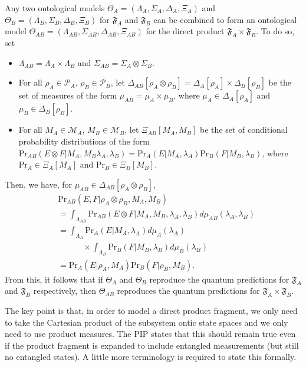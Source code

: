\documentclass[DIV=calc,paper=a4,fontsize=11pt,twocolumn]{scrartcl} %
\theoremstyle{definition}
\theoremstyle{plain}
\begin{document}
Any two ontological models $\Theta_A = (\Lambda_A, \Sigma_A, \Delta_A,
\Xi_A)$ and $\Theta_B = (\Lambda_B, \Sigma_B, \Delta_B, \Xi_B)$ for
$\mathfrak{F}_A$ and $\mathfrak{F}_B$ can be combined to form an
ontological model $\Theta_{AB} = (\Lambda_{AB}, \Sigma_{AB},
\Delta_{AB}, \Xi_{AB})$ for the direct product $\mathfrak{F}_A \times
\mathfrak{F}_B$.  To do so, set
\begin{itemize}
\item $\Lambda_{AB} = \Lambda_A \times \Lambda_B$ and $\Sigma_{AB} =
\Sigma_A \otimes \Sigma_B$.
\item For all $\rho_A \in \mathcal{P}_A$, $\rho_B \in \mathcal{P}_B$,
let $\Delta_{AB}[\rho_A \otimes \rho_B] = \Delta_A[\rho_A] \times
\Delta_B[\rho_B]$ be the set of measures of the form $\mu_{AB} =
\mu_A \times \mu_B$, where $\mu_A \in \Delta_A[\rho_A]$ and $\mu_B
\in \Delta_B[\rho_B]$.
\item  For all $M_A \in \mathcal{M}_A$, $M_B \in \mathcal{M}_B$, let
$\Xi_{AB}[M_A,M_B]$ be the set of conditional probability
distributions of the form
$\text{Pr}_{AB}(E \otimes F|M_A,M_B\lambda_A,\lambda_B) =
\text{Pr}_A(E|M_A,\lambda_A)\text{Pr}_B(F|M_B,\lambda_B)$,
where $\text{Pr}_A \in \Xi_A[M_A]$ and $\text{Pr}_B \in
\Xi_B[M_B]$.
\end{itemize}
Then, we have, for $\mu_{AB} \in \Delta_{AB}[\rho_A \otimes \rho_B]$,
\begin{align}
& \text{Pr}_{AB}(E,F|\rho_A \otimes \rho_B,M_A,M_B)\nonumber\\
& = \int_{\Lambda_{AB}} \text{Pr}_{AB}(E \otimes F
|M_A,M_B,\lambda_A,\lambda_B) d\mu_{AB}(\lambda_A,
\lambda_B) \\
& = \int_{\Lambda_A} \text{Pr}_A(E|M_A,\lambda_A) d \mu_{A}
(\lambda_A) \nonumber\\& \quad\quad\quad \times \int_{\Lambda_B} \text{Pr}_B(F|M_B,\lambda_B) d
\mu_{B}(\lambda_B) \\
& = \text{Pr}_A(E|\rho_A,M_A)\text{Pr}_B(F|\rho_B,M_B).
\end{align}
From this, it follows that if $\Theta_A$ and $\Theta_B$ reproduce the
quantum predictions for $\mathfrak{F}_A$ and $\mathfrak{F}_B$
respectively, then $\Theta_{AB}$ reproduces the quantum predictions
for $\mathfrak{F}_A \times \mathfrak{F}_B$.

The key point is that, in order to model a direct product fragment, we
only need to take the Cartesian product of the subsystem ontic state
spaces and we only need to use product measures.  The PIP states that
this should remain true even if the product fragment is expanded to
include entangled measurements (but still no entangled states).  A
little more terminology is required to state this formally.
\end{document}
